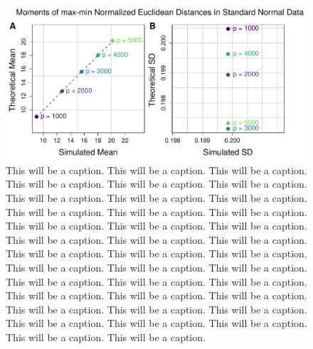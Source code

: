 \documentclass[10pt,letterpaper]{article}\usepackage[]{graphicx}\usepackage[]{color}
\begin{document}
\begin{figure}[H]
	\includegraphics[width=\textwidth]{compared_moments_normal_euclidean_max-min.pdf}
	\caption{This will be a caption. This will be a caption. This will be a caption. This will be a caption. This will be a caption. This will be a caption. This will be a caption. This will be a caption. This will be a caption. This will be a caption. This will be a caption. This will be a caption. This will be a caption. This will be a caption. This will be a caption. This will be a caption. This will be a caption. This will be a caption. This will be a caption. This will be a caption. This will be a caption. This will be a caption. This will be a caption. This will be a caption. This will be a caption. This will be a caption. This will be a caption. This will be a caption. This will be a caption. This will be a caption. This will be a caption. This will be a caption. This will be a caption. This will be a caption. This will be a caption. This will be a caption. This will be a caption. This will be a caption.}
\end{figure}
\end{document}
